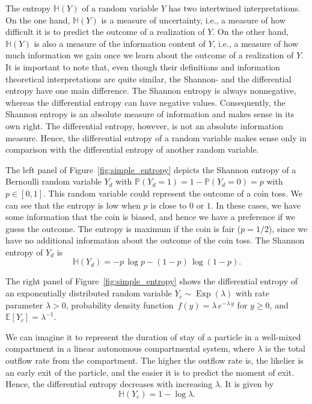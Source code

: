 \documentclass[smallextended]{svjour3}
\renewcommand{\P}{\mathbb{P}}
\newcommand{\E}{\mathbb{E}}
\renewcommand{\H}{\mathbb{H}}
\newcommand{\Exp}{\operatorname{Exp}}
\newcommand{\ie}{i.e.}
\newcommand{\pdf}{probability density function}
\begin{document}
The entropy $\H(Y)$ of a random variable $Y$ has two intertwined interpretations.
On the one hand, $\H(Y)$ is a measure of uncertainty, \ie, a measure of how difficult it is to predict the outcome of a realization of $Y$.
On the other hand, $\H(Y)$ is also a measure of the information content of $Y$, \ie, a measure of how much information we gain once we learn about the outcome of a realization of $Y$.
It is important to note that, even though their definitions and information theoretical interpretations are quite similar, the Shannon- and the differential entropy have one main difference.
The Shannon entropy is always nonnegative, whereas the differential entropy can have negative values.
Consequently, the Shannon entropy is an absolute measure of information and makes sense in its own right.
The differential entropy, however, is not an absolute information measure.
Hence, the differential entropy of a random variable makes sense only in comparison with the differential entropy of another random variable.

The left panel of Figure~\ref{fig:simple_entropy} depicts the Shannon entropy of a Bernoulli random variable $Y_d$ with $\P(Y_d=1)=1-\P(Y_d=0)=p$ with $p\in[0,1]$.
This random variable could represent the outcome of a coin toss.
We can see that the entropy is low when $p$ is close to $0$ or $1$.
In these cases, we have some information that the coin is biased, and hence we have a preference if we guess the outcome.
The entropy is maximum if the coin is fair ($p=1/2$), since we have no additional information about the outcome of the coin toss.
The Shannon entropy of $Y_d$ is
\begin{equation*}
	\H(Y_d) = -p\,\log p - (1-p)\,\log(1-p).
\end{equation*}

The right panel of Figure~\ref{fig:simple_entropy} shows the differential entropy of an exponentially distributed random variable $Y_c\sim\Exp(\lambda)$ with rate parameter $\lambda>0$, \pdf\ $f(y) = \lambda\,e^{-\lambda\,y}$ for $y\geq0$, and $\E\left[Y_c\right]=\lambda^{-1}$.

We can imagine it to represent the duration of stay of a particle in a well-mixed compartment in a linear autonomous compartmental system, where $\lambda$ is the total outflow rate from the compartment.
The higher the outflow rate is, the likelier is an early exit of the particle, and the easier it is to predict the moment of exit.
Hence, the differential entropy decreases with increasing $\lambda$.
It is given by
\begin{equation*}
	\H(Y_c) = 1-\log\lambda.
\end{equation*}
\end{document}
